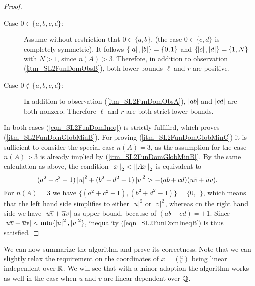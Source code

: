 \begin{proof}
\begin{description}
\item[Case $0 \in \{a,b,c,d\}$:] Assume without restriction that $0 \in \{a,b\}$, (the case $0 \in \{c,d\}$ is completely symmetric). It follows $\{\left|a\right|,\left|b\right|\} = \{0,1\}$ and $\{\left|c\right|,\left|d\right|\} = \{1,N\}$ with $N > 1$, since $n(A) > 3$. Therefore, in addition to observation (\ref{itm_SL2FunDomObsB}), both lower bounds $\ell$ and $r$ are positive. 
\item[Case $0 \notin \{a,b,c,d\}$:] In addition to observation (\ref{itm_SL2FunDomObsA}), $\left|ab\right|$ and $\left|cd\right|$ are both nonzero. Therefore $\ell$ and $r$ are both strict lower bounds.
\end{description}
In both cases (\ref{eqn_SL2FunDomIneq}) is strictly fulfilled, which proves (\ref{itm_SL2FunDomGlobMinB}). For proving (\ref{itm_SL2FunDomGlobMinC}) it is sufficient to consider the special case $n(A) = 3$, as the assumption for the case $n(A) > 3$ is already implied by (\ref{itm_SL2FunDomGlobMinB}). By the same calculation as above, the condition $\left\| x \right\|_2 < \left\| Ax \right\|_2$ is equivalent to
\begin{equation}
\label{eqn_SL2FunDomIneqB}
(a^2 + c^2 - 1)\left|u\right|^2 + (b^2 + d^2 - 1)\left|v\right|^2 > -(ab + cd)(u\overline{v} + \overline{u}v).
\end{equation}
For $n(A) = 3$ we have $\{(a^2 + c^2 - 1),(b^2 + d^2 - 1)\} = \{0,1\}$, which means that the left hand side simplifies to either $\left|u\right|^2$ or $\left|v\right|^2$, whereas on the right hand side we have $\left|u\overline{v} + \overline{u}v\right|$ as upper bound, because of $(ab + cd) = \pm 1$. Since $\left|u\overline{v} + \overline{u}v\right| < \min\{\left|u\right|^2,\left|v\right|^2\}$, inequality (\ref{eqn_SL2FunDomIneqB}) is thus satisfied.
\end{proof}

We can now summarize the algorithm and prove its correctness. Note that we can slightly relax the requirement on the coordinates of $x = ({}^u_v)$ being linear independent over $\mathbb{R}$. We will see that with a minor adaption the algorithm works as well in the case when $u$ and $v$ are linear dependent over $\mathbb{Q}$.

